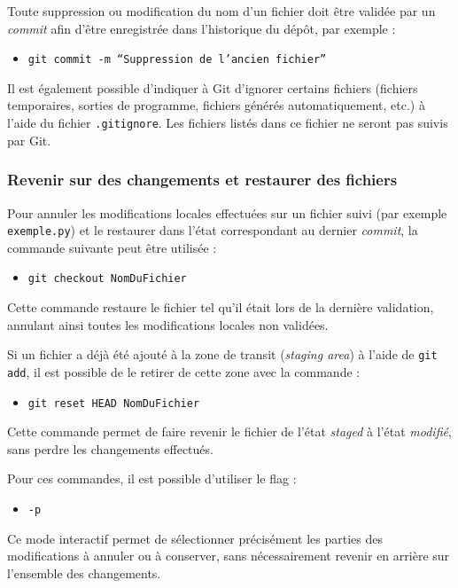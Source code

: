 \documentclass{article}
\begin{document}
Toute suppression ou modification du nom d’un fichier doit être validée par un \emph{commit} afin d’être enregistrée dans l’historique du dépôt, par exemple :
\begin{itemize}
    \item \texttt{git commit -m ``Suppression de l'ancien fichier''}
\end{itemize}

Il est également possible d’indiquer à Git d’ignorer certains fichiers (fichiers temporaires, sorties de programme, fichiers générés automatiquement, etc.) à l’aide du fichier \texttt{.gitignore}. Les fichiers listés dans ce fichier ne seront pas suivis par Git.

\subsubsection{Revenir sur des changements et restaurer des fichiers}

Pour annuler les modifications locales effectuées sur un fichier suivi (par exemple \texttt{exemple.py}) et le restaurer dans l’état correspondant au dernier \emph{commit}, la commande suivante peut être utilisée :
\begin{itemize}
    \item \texttt{git checkout NomDuFichier}
\end{itemize}
Cette commande restaure le fichier tel qu’il était lors de la dernière validation, annulant ainsi toutes les modifications locales non validées.

\vspace{0.3cm}

Si un fichier a déjà été ajouté à la zone de transit (\emph{staging area}) à l’aide de \texttt{git add}, il est possible de le retirer de cette zone avec la commande :
\begin{itemize}
    \item \texttt{git reset HEAD NomDuFichier}
\end{itemize}
Cette commande permet de faire revenir le fichier de l’état \emph{staged} à l’état \emph{modifié}, sans perdre les changements effectués.

Pour ces commandes, il est possible d’utiliser le flag :
\begin{itemize}
    \item \texttt{-p}
\end{itemize}
Ce mode interactif permet de sélectionner précisément les parties des modifications à annuler ou à conserver, sans nécessairement revenir en arrière sur l’ensemble des changements.
\end{document}
